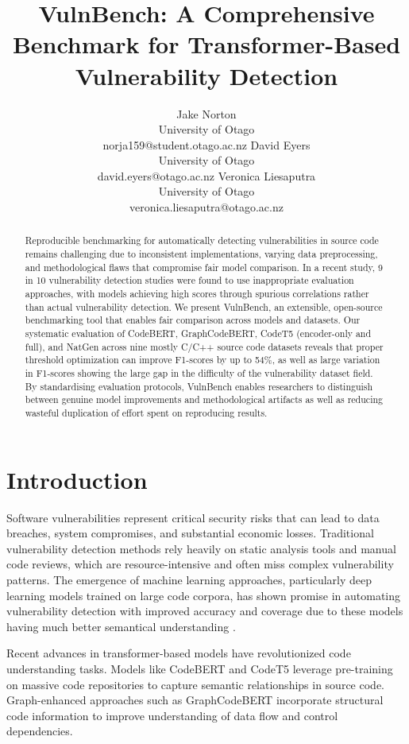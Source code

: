 \documentclass[letterpaper]{article}
\title{VulnBench: A Comprehensive Benchmark for Transformer-Based Vulnerability Detection}
\author{
Jake Norton\\
University of Otago\\
norja159@student.otago.ac.nz
\And
David Eyers\\
University of Otago\\
david.eyers@otago.ac.nz
\And
Veronica Liesaputra\\
University of Otago\\
veronica.liesaputra@otago.ac.nz
}
\begin{document}
\maketitle

\begin{abstract}
	Reproducible benchmarking for automatically detecting vulnerabilities in source code remains challenging due to inconsistent implementations, varying data preprocessing, and methodological flaws that compromise fair model comparison. In a recent study, 9 in 10 vulnerability detection studies were found to use inappropriate evaluation approaches, with models achieving high scores through spurious correlations rather than actual vulnerability detection. We present VulnBench, an extensible, open-source benchmarking tool that enables fair comparison across models and datasets. Our systematic evaluation of CodeBERT, GraphCodeBERT, CodeT5 (encoder-only and full), and NatGen across nine mostly C/C++ source code datasets reveals that proper threshold optimization can improve F1-scores by up to 54\%, as well as large variation in F1-scores showing the large gap in the difficulty of the vulnerability dataset field. By standardising evaluation protocols, VulnBench enables researchers to distinguish between genuine model improvements and methodological artifacts as well as reducing wasteful duplication of effort spent on reproducing results.
\end{abstract}


\section{Introduction}

Software vulnerabilities represent critical security risks that can lead to data breaches, system compromises, and substantial economic losses. Traditional vulnerability detection methods rely heavily on static analysis tools and manual code reviews, which are resource-intensive and often miss complex vulnerability patterns. The emergence of machine learning approaches, particularly deep learning models trained on large code corpora, has shown promise in automating vulnerability detection with improved accuracy and coverage due to these models having much better semantical understanding \citep{systematic2024survey}.

Recent advances in transformer-based models have revolutionized code understanding tasks. Models like CodeBERT \citep{feng2020codebert} and CodeT5 \citep{wang2021codet5} leverage pre-training on massive code repositories to capture semantic relationships in source code. Graph-enhanced approaches such as GraphCodeBERT \citep{guo2021graphcodebert} incorporate structural code information to improve understanding of data flow and control dependencies.
\end{document}
